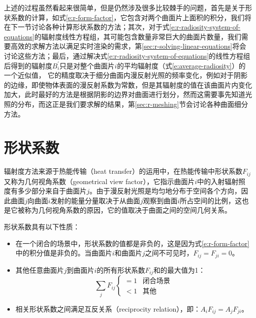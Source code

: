 上述的过程虽然看起来很简单，但是仍然涉及很多比较棘手的问题，首先是关于形状系数的计算，如式\ref{e:r-form-factor}，它包含对两个曲面片上面积的积分，我们将在下一节讨论各种计算形状系数的方法；其次，对于式\ref{e:r-radiosity-system-of-equations}的辐射度线性方程组，其可能包含数量非常巨大的曲面片数量，我们需要高效的求解方法以满足实时渲染的需求，第\ref{sec:r-solving-linear-equations}将会讨论这些方法；最后，通过解决式\ref{e:r-radiosity-system-of-equations}的线性方程组后得到的辐射度$B^{'}_{i}$只是对整个曲面片$i$的平均辐射度（式\ref{e:average-radiosity}）的一个近似值， 它的精度取决于细分曲面内漫反射光照的频率变化，例如对于阴影的边缘，即使物体表面的漫反射系数为常数，但是其辐射度的值在该曲面片内变化加大，此时最好的方法是根据阴影的边界对曲面进行划分，然而这需要事先知道光照的分布，而这正是我们要求解的结果，第\ref{sec:r-meshing}节会讨论各种曲面细分方法。





\section{形状系数}\label{sec:r-form-factors}
辐射度方法来源于热能传输（heat transfer）的运用中，在热能传输中形状系数$F_{ij}$又称为几何视角系数（geometrical view factor），它指示曲面片$i$中的入射辐射照度有多少部分来自于曲面片$j$。由于漫反射光照是均匀地分布于空间各个方向，因此曲面$j$向曲面$i$发射的能量分量取决于从曲面$j$观察到曲面$i$所占空间的比例，这也是它被称为几何视角系数的原因，它的值取决于曲面之间的空间几何关系。

形状系数具有以下性质：

\begin{itemize}
	\item 在一个闭合的场景中，形状系数的值都是非负的，这是因为式\ref{e:r-form-factor}中的积分值是非负的。当曲面片$i$和曲面片$j$之间不可见时，$F_{ij}=F_{ji}=0$。
	\item 其他任意曲面片$j$到曲面片$i$的所有形状系数$F_{ij}$和的最大值为1：
		\begin{equation}
			\sum_j F_{ij}\begin{cases}
				  =1  & \text{闭合场景}\\
			      <1  & \text{其他}  
				\end{cases}
		\end{equation}
	\item 相关形状系数之间满足互反关系（reciprocity relation），即：$A_iF_{ij}=A_jF_{ji}$。
\end{itemize}

